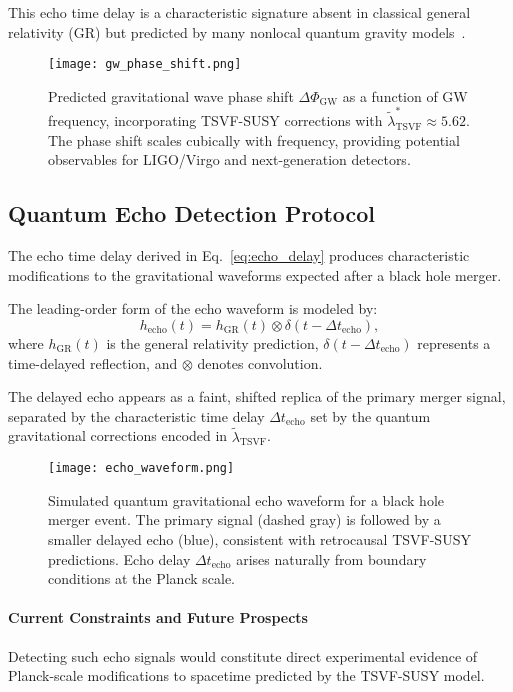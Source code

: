 \documentclass[twocolumn,superscriptaddress,floatfix]{revtex4-2}
\begin{document}
This echo time delay is a characteristic signature absent in classical general relativity (GR) but predicted by many nonlocal quantum gravity models~\cite{Biswas2003}.

\begin{figure}[htbp]
\centering
\texttt{[image: gw\_phase\_shift.png]}
\caption{Predicted gravitational wave phase shift \(\Delta\Phi_{\text{GW}}\) as a function of GW frequency, incorporating TSVF-SUSY corrections with \(\tilde{\lambda}_{\text{TSVF}}^* \approx 5.62\). The phase shift scales cubically with frequency, providing potential observables for LIGO/Virgo and next-generation detectors.}
\label{fig:gw_phase}
\end{figure}


\subsection{Quantum Echo Detection Protocol}
\label{subsec:echo_protocol}

The echo time delay derived in Eq.~\eqref{eq:echo_delay} produces characteristic modifications to the gravitational waveforms expected after a black hole merger.

The leading-order form of the echo waveform is modeled by:
\begin{equation}
h_{\text{echo}}(t) = h_{\text{GR}}(t) \otimes \delta(t - \Delta t_{\text{echo}}),
\end{equation}
where \(h_{\text{GR}}(t)\) is the general relativity prediction, \(\delta(t - \Delta t_{\text{echo}})\) represents a time-delayed reflection, and \(\otimes\) denotes convolution.

The delayed echo appears as a faint, shifted replica of the primary merger signal, separated by the characteristic time delay \(\Delta t_{\text{echo}}\) set by the quantum gravitational corrections encoded in \(\tilde{\lambda}_{\text{TSVF}}\).

\begin{figure}[htbp]
\centering
\texttt{[image: echo\_waveform.png]}
\caption{Simulated quantum gravitational echo waveform for a black hole merger event. The primary signal (dashed gray) is followed by a smaller delayed echo (blue), consistent with retrocausal TSVF-SUSY predictions. Echo delay \(\Delta t_{\text{echo}}\) arises naturally from boundary conditions at the Planck scale.}
\label{fig:echo}
\end{figure}

\paragraph{Current Constraints and Future Prospects}  
Detecting such echo signals would constitute direct experimental evidence of Planck-scale modifications to spacetime predicted by the TSVF-SUSY model.
\end{document}
